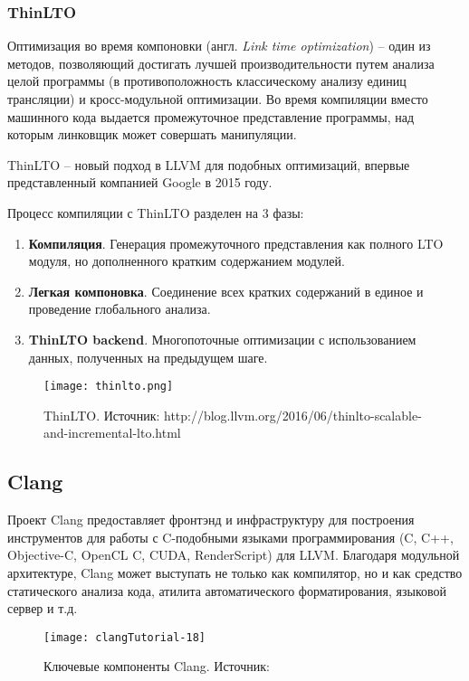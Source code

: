 \subsubsection{ThinLTO}
Оптимизация во время компоновки (англ. \textit{Link time optimization}) -- один
из методов, позволяющий достигать лучшей производительности путем анализа целой
программы (в противоположность классическому анализу единиц трансляции) и
кросс-модульной оптимизации. Во время компиляции вместо машинного кода выдается
промежуточное представление программы, над которым линковщик может совершать
манипуляции.

ThinLTO -- новый подход в LLVM для подобных оптимизаций, впервые представленный
компанией Google в 2015 году\cite{Johnson}.

Процесс компиляции с ThinLTO разделен на 3 фазы:
\begin{enumerate}
  \item \textbf{Компиляция}. Генерация промежуточного представления как полного
        LTO модуля, но дополненного кратким содержанием модулей.
  \item \textbf{Легкая компоновка}. Соединение всех кратких содержаний в единое
        и проведение глобального анализа.
  \item \textbf{ThinLTO backend}. Многопоточные оптимизации с использованием
        данных, полученных на предыдущем шаге.
\end{enumerate}
\begin{figure}[h]
  \centering
  \texttt{[image: thinlto.png]}
  \caption{ThinLTO. Источник: http://blog.llvm.org/2016/06/thinlto-scalable-and-incremental-lto.html}
\end{figure}

\subsection{Clang}
Проект Clang предоставляет фронтэнд и инфраструктуру для построения инструментов
для работы с C-подобными языками программирования (C, C++, Objective-C,
OpenCL C, CUDA, RenderScript) для LLVM. Благодаря модульной архитектуре, Clang
может выступать не только как компилятор, но и как средство статического анализа
кода, атилита автоматического форматирования, языковой сервер и т.д.

\begin{figure}[h]
  \centering
  \texttt{[image: clangTutorial-18]}
  \caption{Ключевые компоненты Clang. Источник: \cite{VanHaagstretSvenARMandStulova2019}}
  \label{fig:clang_core}
\end{figure}
